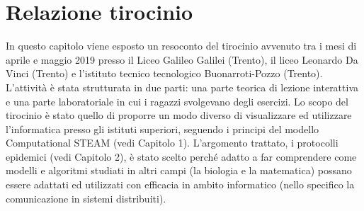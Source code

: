 \chapter{Relazione tirocinio}
\label{cha:conclusioni}


In questo capitolo viene esposto un resoconto del tirocinio avvenuto tra i mesi di aprile e maggio 2019 presso il Liceo Galileo Galilei (Trento), il liceo Leonardo Da Vinci (Trento) e l’istituto tecnico tecnologico Buonarroti-Pozzo (Trento). L’attività è stata strutturata in due parti: una parte teorica di lezione interattiva e una parte laboratoriale in cui i ragazzi svolgevano degli esercizi. Lo scopo del tirocinio è stato quello di proporre un modo diverso di visualizzare ed utilizzare l’informatica presso gli istituti superiori, seguendo i principi del modello Computational STEAM (vedi Capitolo 1). L’argomento trattato, i protocolli epidemici (vedi Capitolo 2), è stato scelto perché adatto a far comprendere come modelli e algoritmi studiati in altri campi (la biologia e la matematica) possano essere adattati ed utilizzati con efficacia in ambito informatico (nello specifico la comunicazione in sistemi distribuiti).

